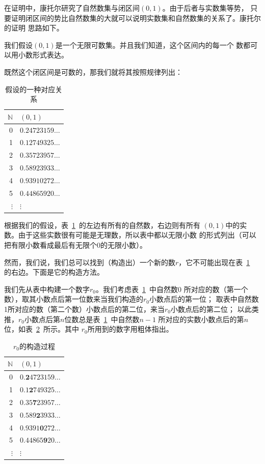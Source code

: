 在证明中，康托尔研究了自然数集与闭区间$\left( 0,1\right) $。由于后者与实数集等势，
只要证明闭区间的势比自然数集的大就可以说明实数集和自然数集的关系了。康托尔的证明
思路如下。

我们假设$\left( 0,1 \right) $是一个无限可数集。并且我们知道，这个区间内的每一个
数都可以用小数形式表达。

既然这个闭区间是可数的，那我们就将其按照规律列出：

\begin{table}[h]
    \centering
    \caption{假设的一种对应关系}\label{tbl:cantor_diagonal}
    \begin{tabular}{r|l}
        $\mathbb{N}$& $\left( 0,1 \right) $\\
        \hline
        0 & $0.24723159\ldots $\\
        1 & $0.12749325\ldots $\\
        2 & $0.35723957\ldots $\\
        3 & $0.58923933\ldots $\\
        4 & $0.93910272\ldots $\\
        5 & $0.44865920\ldots $\\
        $\vdots$ & $\vdots$
    \end{tabular}
\end{table}

根据我们的假设，表~\ref{tbl:cantor_diagonal}~的左边有所有的自然数，右边则有所有
$\left( 0,1 \right) $中的实数。由于这些实数很有可能是无理数，所以表中都以无限小数
的形式列出（可以把有限小数看成最后有无限个0的无限小数）。

然而，我们说，我们总可以找到（构造出）一个新的数$r$，它不可能出现在表~\ref{tbl:cantor_diagonal}~%
的右边。下面是它的构造方法。

我们先从表中构建一个数字$r_{0}$。我们考虑表~\ref{tbl:cantor_diagonal}~中自然数0
所对应的数（第一个数），取其小数点后第一位数来当我们构造的$r_{0}$小数点后的第一位；
取表中自然数1所对应的数（第二个数）小数点后的第二位，来当$r_{0}$小数点后的第二位；
以此类推，$r_{0}$小数点后第$n$位数总是表~\ref{tbl:cantor_diagonal}~中自然数$n-1$
所对应的实数小数点后的第$n$位，如表~\ref{tbl:cantor_diagonal_maker0}~所示。其中
$r_{0}$所用到的数字用粗体指出。

\begin{table}[h]
    \centering
    \caption{$r_{0}$的构造过程}\label{tbl:cantor_diagonal_maker0}
    \begin{tabular}{r|l}
        $\mathbb{N}$& $\left( 0,1 \right) $\\
        \hline
        0 & $0.\mathbf{2}4723159\ldots $\\
        1 & $0.1\mathbf{2}749325\ldots $\\
        2 & $0.35\mathbf{7}23957\ldots $\\
        3 & $0.589\mathbf{2}3933\ldots $\\
        4 & $0.9391\mathbf{0}272\ldots $\\
        5 & $0.44865\mathbf{9}20\ldots $\\
        $\vdots$ & $\vdots$
    \end{tabular}
\end{table}

